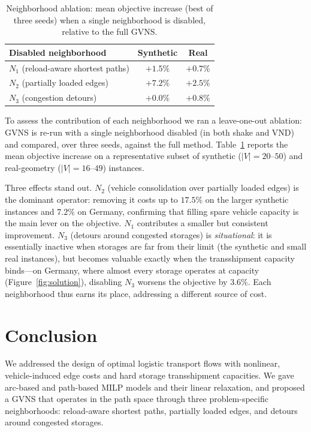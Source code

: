 \documentclass[runningheads]{llncs}
\begin{document}
\begin{table}[t]
\centering
\caption{Neighborhood ablation: mean objective increase (best of three seeds)
when a single neighborhood is disabled, relative to the full GVNS.}
\label{tab:ablation}
\small
\begin{tabular}{lcc}
\toprule
Disabled neighborhood & Synthetic & Real\\
\midrule
$N_1$ (reload-aware shortest paths) & $+1.5\%$ & $+0.7\%$\\
$N_2$ (partially loaded edges)      & $+7.2\%$ & $+2.5\%$\\
$N_3$ (congestion detours)          & $+0.0\%$ & $+0.8\%$\\
\bottomrule
\end{tabular}
\end{table}
To assess the contribution of each neighborhood we ran a leave-one-out ablation:
GVNS is re-run with a single neighborhood disabled (in both shake and VND) and
compared, over three seeds, against the full method. Table~\ref{tab:ablation}
reports the mean objective increase on a representative subset of synthetic
($|V|=20$--$50$) and real-geometry ($|V|=16$--$49$) instances.



Three effects stand out. $N_2$ (vehicle consolidation over partially loaded
edges) is the dominant operator: removing it costs up to $17.5\%$ on the larger
synthetic instances and $7.2\%$ on Germany, confirming that filling spare vehicle
capacity is the main lever on the objective. $N_1$ contributes a smaller but
consistent improvement. $N_3$ (detours around congested storages) is
\emph{situational}: it is essentially inactive when storages are far from their
limit (the synthetic and small real instances), but becomes valuable exactly when
the transshipment capacity binds---on Germany, where almost every storage operates
at capacity (Figure~\ref{fig:solution}), disabling $N_3$ worsens the objective by
$3.6\%$. Each neighborhood thus earns its place, addressing a different source of
cost.



\section{Conclusion}
We addressed the design of optimal logistic transport flows with nonlinear,
vehicle-induced edge costs and hard storage transshipment capacities. We gave
arc-based and path-based MILP models and their linear relaxation, and proposed a
GVNS that operates in the path space through three problem-specific
neighborhoods: reload-aware shortest paths, partially loaded edges, and detours
around congested storages. 
\end{document}
